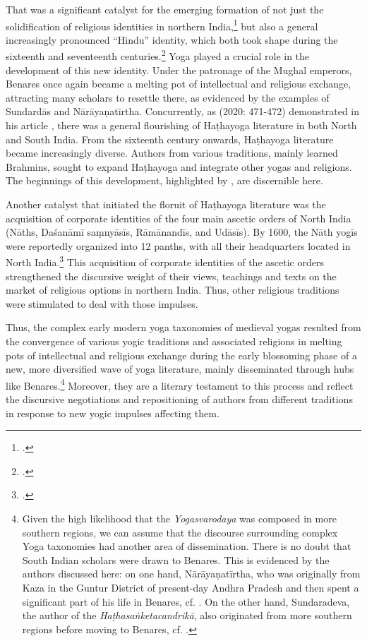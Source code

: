 That was a significant catalyst for the emerging formation of not just the solidification of religious identities in northern India,\footnote{\citeauthor[2011]{ohanlon2011religious}.} but also a general increasingly pronounced ``Hindu'' identity, which both took shape during the sixteenth and seventeenth centuries.\footnote{\citeauthor[2006: 188]{clark2006}.} Yoga played a crucial role in the development of this new identity. Under the patronage of the Mughal emperors, Benares once again became a melting pot of intellectual and religious exchange, attracting many scholars to resettle there, as evidenced by the examples of Sundardās and Nārāyaṇatīrtha. Concurrently, as \citeauthor{birch2020} (2020: 471-472) demonstrated in his article , there was a general flourishing of Haṭhayoga literature in both North and South India. From the sixteenth century onwards, Haṭhayoga literature became increasingly diverse. Authors from various traditions, mainly learned Brahmins, sought to expand Haṭhayoga and integrate other yogas and religions. The beginnings of this development, highlighted by \citeauthor{birch2020}, are discernible here.

Another catalyst that initiated the floruit of Haṭhayoga literature was the acquisition of corporate identities of the four main ascetic orders of North India (Nāths, Daśanāmī saṃnyāsīs, Rāmānandīs, and Udāsīs). By 1600, the Nāth yogīs were reportedly organized into 12 panths, with all their headquarters located in North India.\footnote{\citeauthor[2011: 17]{mallinsonnath}.} This acquisition of corporate identities of the ascetic orders strengthened the discursive weight of their views, teachings and texts on the market of religious options in northern India. Thus, other religious traditions were stimulated to deal with those impulses.    
 
Thus, the complex early modern yoga taxonomies of medieval yogas resulted from the convergence of various yogic traditions and associated religions in melting pots of intellectual and religious exchange during the early blossoming phase of a new, more diversified wave of yoga literature, mainly disseminated through hubs like Benares.\footnote{Given the high likelihood that the \emph{Yogasvarodaya} was composed in more southern regions, we can assume that the discourse surrounding complex Yoga taxonomies had another area of dissemination. There is no doubt that South Indian scholars were drawn to Benares. This is evidenced by the authors discussed here: on one hand, Nārāyaṇatīrtha, who was originally from Kaza in the Guntur District of present-day Andhra Pradesh and then spent a significant part of his life in Benares, cf. \citeauthor[1993: 43]{endo1993}. On the other hand, Sundaradeva, the author of the \emph{Haṭhasaṅketacandrikā}, also originated from more southern regions before moving to Benares, cf. \citeauthor[2018: 123 n. 61]{birch2018proliferation}.} Moreover, they are a literary testament to this process and reflect the discursive negotiations and repositioning of authors from different traditions in response to new yogic impulses affecting them.

